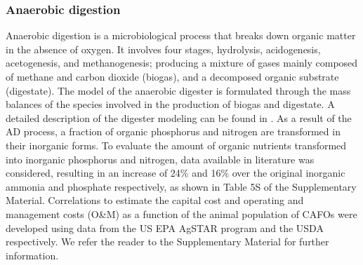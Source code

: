 \documentclass[authoryear]{elsarticle}
\begin{document}
\subsubsection{Anaerobic digestion}
Anaerobic digestion is a microbiological process that breaks down organic matter in the absence of oxygen. It involves four stages, hydrolysis, acidogenesis, acetogenesis, and methanogenesis; producing a mixture of gases mainly composed of methane and carbon dioxide (biogas), and a decomposed organic substrate (digestate). The model of the anaerobic digester is formulated through the mass balances of the species involved in the production of biogas and digestate. A detailed description of the digester modeling can be found in \citet{Leon}. As a result of the AD process, a fraction of organic phosphorus and nitrogen are transformed in their inorganic forms. To evaluate the amount of organic nutrients transformed into inorganic phosphorus and nitrogen, data available in literature was considered, resulting in an increase of 24\% and 16\% over the original inorganic ammonia and phosphate respectively, as shown in Table 5S of the Supplementary Material.
Correlations to estimate the capital cost
and operating and management costs (O\&M)
as a function of the animal population of CAFOs were developed using data from the US EPA AgSTAR program \citep{AgSTAR2003} and the USDA \citep{USDA_OM} respectively. We refer the reader to the Supplementary Material for further information.
%
\end{document}

